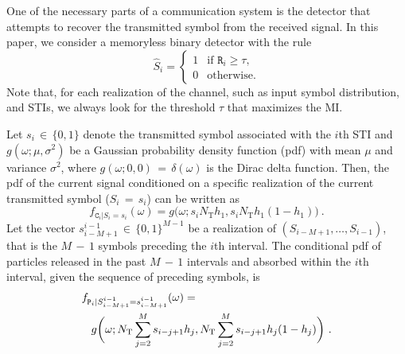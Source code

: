 \documentclass[journal]{IEEEtranTCOM}
\begin{document}
\par One of the necessary parts of a communication system is the detector that attempts to recover the transmitted symbol from the received signal. In this paper, we consider a memoryless binary detector with the rule
\begin{equation}\label{eq:detect}
 \hat{S}_{i}=\begin{cases}
    1 & \text{if $\mathtt{R}_{i}\geq\tau$},\\
    0 & \text{otherwise}.
  \end{cases}
\end{equation}
Note that, for each realization of the channel, such as input symbol distribution, and STIs, we always look for the threshold $\tau$ that maximizes the MI.
\par Let $s_{i}$$\,\in\,$$\{0,1\}$ denote the transmitted symbol associated with the $i$th STI and $g(\omega;\mu,\sigma^2)$ be a Gaussian probability density function (pdf) with mean $\mu$ and variance $\sigma^2$, where $g(\omega;0,0)$$\,=\,$$\delta(\omega)$ is the Dirac delta function.
Then, the pdf of the current signal conditioned on a specific realization of the current transmitted symbol ($S_{i}$$\,=\,$$s_{i}$) can be written as
\begin{equation}
    f_{ \mathtt{C}_{i}|S_{i}=s_{i}}(\omega) = g\Big(\omega;s_{i}N_{\mathrm{T}}h_{1},s_{i}N_{\mathrm{T}}h_{1}(1-h_{1})\Big)~.
\end{equation}
Let the vector $s_{i-M+1}^{i-1}$$\,\in\,$$\{0,1\}^{M-1}$ be a realization of $(S_{i-M+1},\ldots,S_{i-1})$, that is the $M$$\,-\,$$1$ symbols preceding the $i$th interval. The conditional pdf of particles released in the past $M$$\,-\,$$1$ intervals and absorbed within the $i$th  interval, given the sequence of preceding symbols, is
\begin{align}
    \begin{split}
    &f_{ \mathtt{P}_{i}|S_{i-M+1}^{i-1}=s_{i-M+1}^{i-1}}(\omega) =\\& \hspace{0.3cm} g \bigg(\omega;N_{\mathrm{T}}\sum^{M}_{j=2}s_{i-j+1}h_{j}, N_{\mathrm{T}}\sum^{M}_{j=2}s_{i-j+1}h_{j}(1-h_{j})\bigg)~.
    \end{split}
\end{align}
\end{document}
